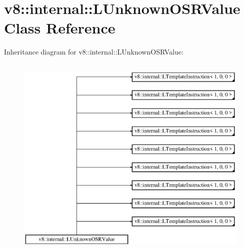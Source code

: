 \hypertarget{classv8_1_1internal_1_1_l_unknown_o_s_r_value}{}\section{v8\+:\+:internal\+:\+:L\+Unknown\+O\+S\+R\+Value Class Reference}
\label{classv8_1_1internal_1_1_l_unknown_o_s_r_value}
Inheritance diagram for v8\+:\+:internal\+:\+:L\+Unknown\+O\+S\+R\+Value\+:\begin{figure}[H]
\begin{center}
\leavevmode
\includegraphics[height=10.000000cm]{classv8_1_1internal_1_1_l_unknown_o_s_r_value}
\end{center}
\end{figure}

